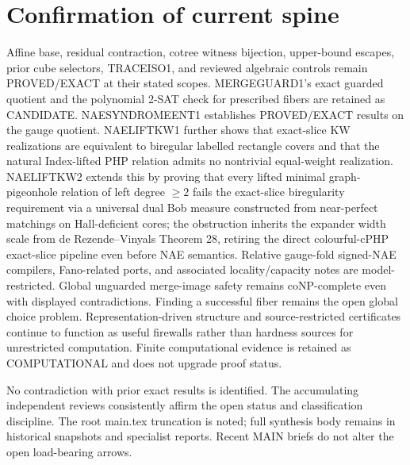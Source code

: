 \documentclass[11pt]{article}
\begin{document}
\section{Confirmation of current spine}
Affine base, residual contraction, cotree witness bijection, upper-bound escapes, prior cube selectors, TRACEISO1, and reviewed algebraic controls remain PROVED/EXACT at their stated scopes. MERGEGUARD1's exact guarded quotient and the polynomial 2-SAT check for prescribed fibers are retained as CANDIDATE. NAESYNDROMEENT1 establishes PROVED/EXACT results on the gauge quotient. NAELIFTKW1 further shows that exact-slice KW realizations are equivalent to biregular labelled rectangle covers and that the natural Index-lifted PHP relation admits no nontrivial equal-weight realization. NAELIFTKW2 extends this by proving that every lifted minimal graph-pigeonhole relation of left degree $\ge 2$ fails the exact-slice biregularity requirement via a universal dual Bob measure constructed from near-perfect matchings on Hall-deficient cores; the obstruction inherits the expander width scale from de Rezende--Vinyals Theorem 28, retiring the direct colourful-cPHP exact-slice pipeline even before NAE semantics. Relative gauge-fold signed-NAE compilers, Fano-related ports, and associated locality/capacity notes are model-restricted. Global unguarded merge-image safety remains coNP-complete even with displayed contradictions. Finding a successful fiber remains the open global choice problem. Representation-driven structure and source-restricted certificates continue to function as useful firewalls rather than hardness sources for unrestricted computation. Finite computational evidence is retained as COMPUTATIONAL and does not upgrade proof status.

No contradiction with prior exact results is identified. The accumulating independent reviews consistently affirm the open status and classification discipline. The root main.tex truncation is noted; full synthesis body remains in historical snapshots and specialist reports. Recent MAIN briefs do not alter the open load-bearing arrows.
\end{document}
